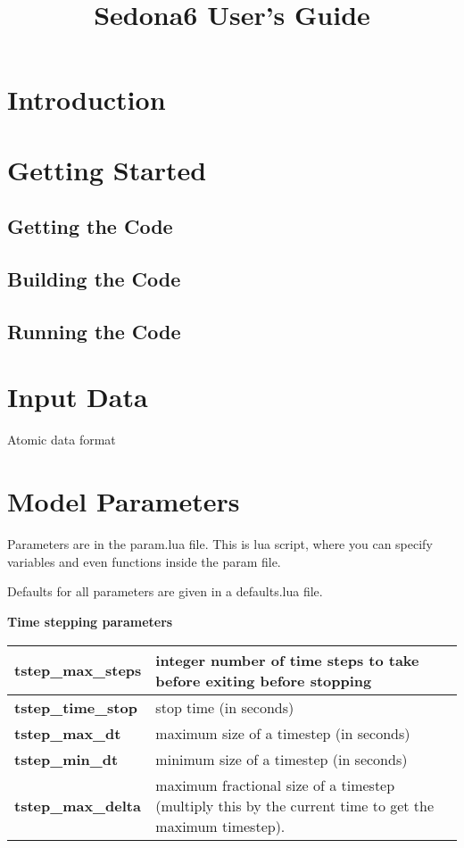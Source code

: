 \documentclass[11pt,letterpaper]{article}
\begin{document}
\title{Sedona6 User's Guide}
\maketitle

\section{Introduction}

\section{Getting Started}

\subsection{Getting the Code}

\subsection{Building the Code}


\subsection{Running the Code}




\section{Input Data}

Atomic data format

\section{Model Parameters}

Parameters are in the param.lua file. This is lua script, where you can specify variables and even functions inside the param file.

Defaults for all parameters are given in a defaults.lua file. 

\begin {table}
\begin{center}
{\bf \large Time stepping parameters}
\end{center}
\begin{tabular}{| >{\bf}l | p{12cm} |  }
\hline
\hline
  tstep\_max\_steps    &  integer number of time steps to take before exiting before stopping \\ \hline
   tstep\_time\_stop    & stop time (in seconds) \\ \hline
  tstep\_max\_dt        & maximum size of a timestep (in seconds)  \\ \hline
 tstep\_min\_dt          & minimum size of a timestep (in seconds)\\ \hline
 tstep\_max\_delta   &  maximum fractional size of a timestep (multiply this by 
 the current time to get the maximum timestep). \\ \hline
\hline
\end{tabular}
\end{table}
\end{document}
